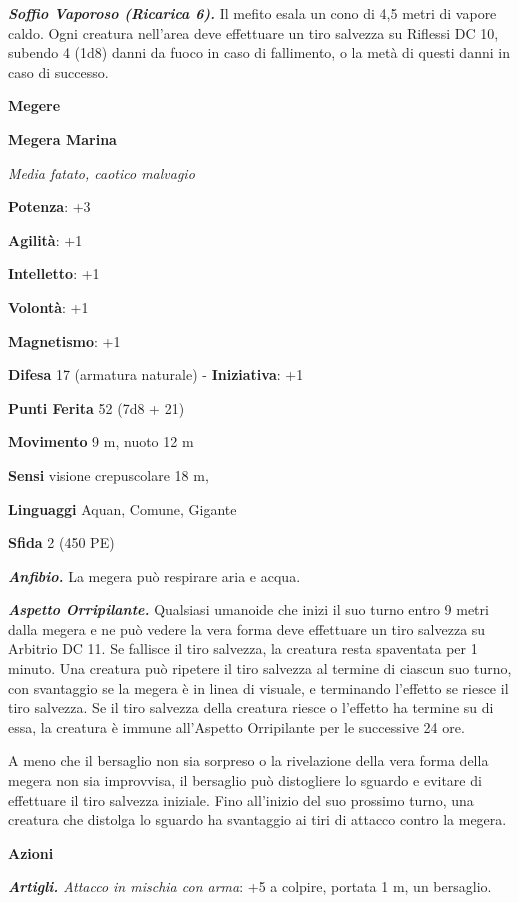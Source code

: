 \begin{multicols}{2}
\emph{\textbf{Soffio Vaporoso (Ricarica 6).}} Il mefito esala un cono di
4,5 metri di vapore caldo. Ogni creatura nell'area deve effettuare un
tiro salvezza su Riflessi DC 10, subendo 4 (1d8) danni da fuoco in caso
di fallimento, o la metà di questi danni in caso di successo.

\textbf{Megere}

\textbf{Megera Marina}

\emph{Media fatato, caotico malvagio}

\textbf{Potenza}: +3

\textbf{Agilità}: +1

\textbf{Intelletto}: +1

\textbf{Volontà}: +1

\textbf{Magnetismo}: +1

\textbf{Difesa} 17 (armatura naturale) - \textbf{Iniziativa}: +1

\textbf{Punti Ferita} 52 (7d8 + 21)

\textbf{Movimento} 9 m, nuoto 12 m

\textbf{Sensi} visione crepuscolare 18 m, 

\textbf{Linguaggi} Aquan, Comune, Gigante

\textbf{Sfida} 2 (450 PE)\smallskip

\emph{\textbf{Anfibio.}} La megera può respirare aria e acqua.

\emph{\textbf{Aspetto Orripilante.}} Qualsiasi umanoide che inizi il suo
turno entro 9 metri dalla megera e ne può vedere la vera forma deve
effettuare un tiro salvezza su Arbitrio DC 11. Se fallisce il tiro
salvezza, la creatura resta spaventata per 1 minuto. Una creatura può
ripetere il tiro salvezza al termine di ciascun suo turno, con
svantaggio se la megera è in linea di visuale, e terminando l'effetto se
riesce il tiro salvezza. Se il tiro salvezza della creatura riesce o
l'effetto ha termine su di essa, la creatura è immune all'Aspetto
Orripilante per le successive 24 ore.

A meno che il bersaglio non sia sorpreso o la rivelazione della vera
forma della megera non sia improvvisa, il bersaglio può distogliere lo
sguardo e evitare di effettuare il tiro salvezza iniziale. Fino
all'inizio del suo prossimo turno, una creatura che distolga lo sguardo
ha svantaggio ai tiri di attacco contro la megera.

\smallskip\textbf{Azioni}

\emph{\textbf{Artigli.} Attacco in mischia con arma}: +5 a colpire,
portata 1 m, un bersaglio.


\end{multicols}
